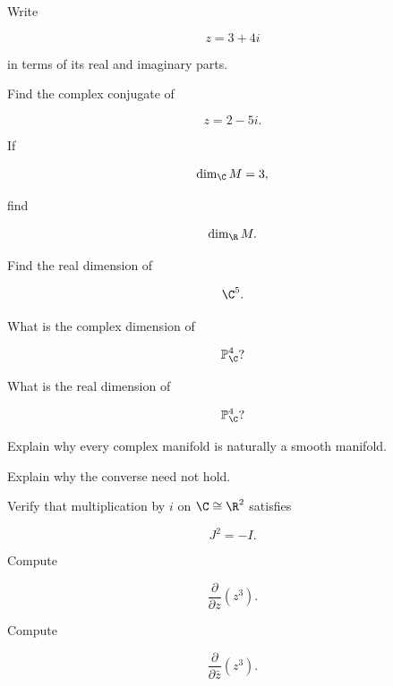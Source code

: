 \begin{exercise}[1]
Write

\[
z=3+4i
\]

in terms of its real and imaginary parts.
\end{exercise}

\begin{exercise}[1]
Find the complex conjugate of

\[
z=2-5i.
\]
\end{exercise}

\begin{exercise}[1]
If

\[
\dim_{\C}M=3,
\]

find

\[
\dim_{\R}M.
\]
\end{exercise}

\begin{exercise}[1]
Find the real dimension of

\[
\C^5.
\]
\end{exercise}

\begin{exercise}[1]
What is the complex dimension of

\[
\mathbb{P}^4_{\C}?
\]
\end{exercise}

\begin{exercise}[1]
What is the real dimension of

\[
\mathbb{P}^4_{\C}?
\]
\end{exercise}

\begin{exercise}[2]
Explain why every complex manifold is naturally a smooth manifold.
\end{exercise}

\begin{exercise}[2]
Explain why the converse need not hold.
\end{exercise}

\begin{exercise}[2]
Verify that multiplication by \(i\) on \(\C\cong\R^2\) satisfies

\[
J^2=-I.
\]
\end{exercise}

\begin{exercise}[2]
Compute

\[
\frac{\partial}{\partial z}(z^3).
\]
\end{exercise}

\begin{exercise}[2]
Compute

\[
\frac{\partial}{\partial\bar z}(z^3).
\]
\end{exercise}

